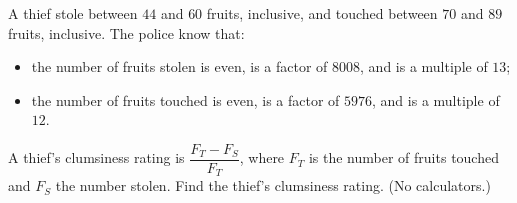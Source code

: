A thief stole between $44$ and $60$ fruits, inclusive, and touched between $70$ and $89$ fruits, inclusive. The police know that:
\begin{itemize}
\item the number of fruits stolen is even, is a factor of $8008$, and is a multiple of $13$;
\item the number of fruits touched is even, is a factor of $5976$, and is a multiple of $12$.
\end{itemize}
A thief's clumsiness rating is $\dfrac{F_T-F_S}{F_T}$, where $F_T$ is the number of fruits touched and $F_S$ the number stolen. Find the thief's clumsiness rating. (No calculators.)
